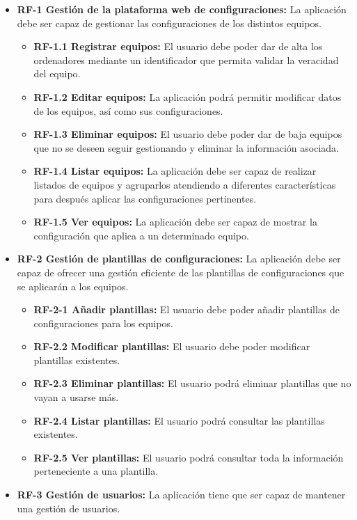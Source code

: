 \begin{itemize}
	\tightlist
	\item \textbf{RF-1 Gestión de la plataforma web de configuraciones:} La aplicación debe ser capaz de gestionar las configuraciones de los distintos equipos.
	\begin{itemize}
		\tightlist
		\item \textbf{RF-1.1 Registrar equipos:} El usuario debe poder dar de alta los ordenadores mediante un identificador que permita validar la veracidad del equipo.
		\item \textbf{RF-1.2 Editar equipos:} La aplicación podrá permitir modificar datos de los equipos, así como sus configuraciones.
		\item \textbf{RF-1.3 Eliminar equipos:} El usuario debe poder dar de baja equipos que no se deseen seguir gestionando y eliminar la información asociada.
		\item \textbf{RF-1.4 Listar equipos:} La aplicación debe ser capaz de realizar listados de equipos y agruparlos atendiendo a diferentes características para después aplicar las configuraciones pertinentes.
		\item \textbf{RF-1.5 Ver equipos:} La aplicación debe ser capaz de mostrar la configuración que aplica a un determinado equipo.
	\end{itemize}
	\item \textbf{RF-2 Gestión de plantillas de configuraciones:} La aplicación debe ser capaz de ofrecer una gestión eficiente de las plantillas de configuraciones que se aplicarán a los equipos.
	\begin{itemize}
		\tightlist
		\item \textbf{RF-2-1 Añadir plantillas:} El usuario debe poder añadir plantillas de configuraciones para los equipos.
		\item \textbf{RF-2.2 Modificar plantillas:} El usuario debe poder modificar plantillas existentes.
		\item \textbf{RF-2.3 Eliminar plantillas:} El usuario podrá eliminar plantillas que no vayan a usarse más.
		\item \textbf{RF-2.4 Listar plantillas:} El usuario podrá consultar las plantillas existentes.
		\item \textbf{RF-2.5 Ver plantillas:} El usuario podrá consultar toda la información perteneciente a una plantilla.
	\end{itemize}
	\item \textbf{RF-3 Gestión de usuarios:} La aplicación tiene que ser capaz de mantener una gestión de usuarios.

\end{itemize}
